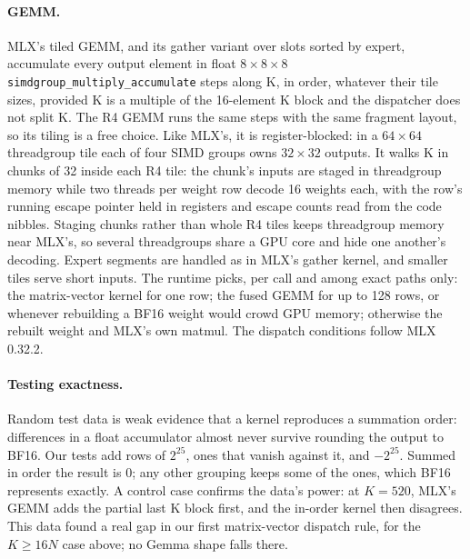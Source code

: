 \documentclass[11pt]{article}
\begin{document}
\paragraph{GEMM.} MLX's tiled GEMM, and its gather variant over slots sorted by expert, accumulate every output element in float $8 \times 8 \times 8$ \texttt{simdgroup\_multiply\_accumulate} steps along K, in order, whatever their tile sizes, provided K is a multiple of the 16-element K block and the dispatcher does not split K. The R4 GEMM runs the same steps with the same fragment layout, so its tiling is a free choice. Like MLX's, it is register-blocked: in a $64 \times 64$ threadgroup tile each of four SIMD groups owns $32 \times 32$ outputs. It walks K in chunks of 32 inside each R4 tile: the chunk's inputs are staged in threadgroup memory while two threads per weight row decode 16 weights each, with the row's running escape pointer held in registers and escape counts read from the code nibbles. Staging chunks rather than whole R4 tiles keeps threadgroup memory near MLX's, so several threadgroups share a GPU core and hide one another's decoding. Expert segments are handled as in MLX's gather kernel, and smaller tiles serve short inputs. The runtime picks, per call and among exact paths only: the matrix-vector kernel for one row; the fused GEMM for up to 128 rows, or whenever rebuilding a BF16 weight would crowd GPU memory; otherwise the rebuilt weight and MLX's own matmul. The dispatch conditions follow MLX 0.32.2.

\paragraph{Testing exactness.} Random test data is weak evidence that a kernel reproduces a summation order: differences in a float accumulator almost never survive rounding the output to BF16. Our tests add rows of $2^{25}$, ones that vanish against it, and $-2^{25}$. Summed in order the result is 0; any other grouping keeps some of the ones, which BF16 represents exactly. A control case confirms the data's power: at $K=520$, MLX's GEMM adds the partial last K block first, and the in-order kernel then disagrees. This data found a real gap in our first matrix-vector dispatch rule, for the $K \ge 16N$ case above; no Gemma shape falls there.
\end{document}
